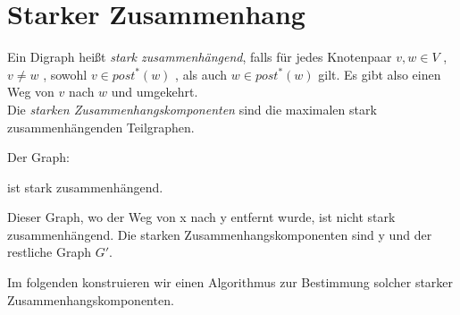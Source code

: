 \section{Starker Zusammenhang}
\begin{definition}
Ein Digraph heißt \emph{stark zusammenhängend}, falls für jedes Knotenpaar $v,w \in  V$ , $v \neq w$ , sowohl $v \in  post^{*}(w)$ , als auch $w \in post^{*}(w)$ gilt.
Es gibt also einen Weg von $v$  nach $w$  und umgekehrt. \\ 
Die \emph{starken Zusammenhangskomponenten} sind die maximalen stark zusammenhängenden Teilgraphen.
\end{definition}
\begin{example}
	Der Graph:
\begin{center}
\end{center}
ist stark zusammenhängend.
\begin{center}
\end{center}
Dieser Graph, wo der Weg von x nach y entfernt wurde, ist nicht stark zusammenhängend. Die starken Zusammenhangskomponenten sind y und der restliche Graph $G'$.
\end{example}
Im folgenden konstruieren wir einen Algorithmus zur Bestimmung solcher starker Zusammenhangskomponenten.

